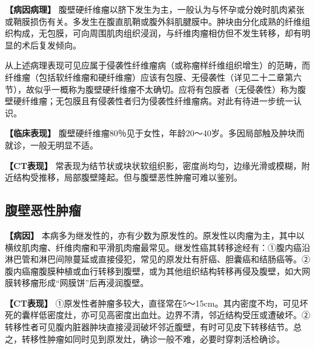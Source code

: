 \textbf{【病因病理】}
腹壁硬纤维瘤以脐下发生为主，一般认为与怀孕或分娩时肌肉紧张或鞘膜损伤有关。多发生在腹直肌鞘或腹外斜肌腱膜中。肿块由分化成熟的纤维组织构成，无包膜，可向周围肌肉组织浸润，与纤维肉瘤相仿但不发生转移，却有明显的术后复发倾向。

从上述病理表现可见应属于侵袭性纤维瘤病（或称瘤样纤维组织增生）的范畴，而纤维瘤（包括软纤维瘤和硬纤维瘤）应该有包膜、无侵袭性（详见二十二章第六节），故似乎一概称为腹壁硬纤维瘤不太确切。应将有包膜者（无侵袭性）称为腹壁硬纤维瘤；无包膜且有侵袭性者归为侵袭性纤维瘤病。对此有待进一步统一认识。

\textbf{【临床表现】}
腹壁硬纤维瘤80％见于女性，年龄20～40岁。多因局部触及肿块而就诊，一般无明显不适。

\textbf{【CT表现】}
常表现为结节状或块状软组织影，密度尚均匀，边缘光滑或模糊，附近结构受推移，局部腹壁隆起。但与腹壁恶性肿瘤可难以鉴别。

\subsection{腹壁恶性肿瘤}

\textbf{【病因】}
本病多为继发性的，亦有少数为原发性的。原发性以肉瘤为主，其中以横纹肌肉瘤、纤维肉瘤和平滑肌肉瘤最常见。继发性癌其转移途经有：①腹内癌沿淋巴管和淋巴间隙蔓延或直接侵犯，常见的原发灶有肝癌、胆囊癌和结肠癌等。②腹内癌瘤腹膜种植或血行转移到腹壁，或为其他组织结构转移再侵及腹壁，如大网膜转移瘤形成“网膜饼”后再浸润腹壁。

\textbf{【CT表现】}
①原发性者肿瘤多较大，直径常在5～15cm。其内密度不均，可见坏死的囊样低密度灶，亦可见高密度出血灶。边界不清，邻近结构受压或遭破坏。②转移性者可见腹内脏器肿块直接浸润破坏邻近腹壁，有时可见皮下转移结节。总之，转移性肿瘤如同时见到原发灶，确诊一般不难，必要时穿刺活检确诊。

\protect\hypertarget{text00026.html}{}{}


